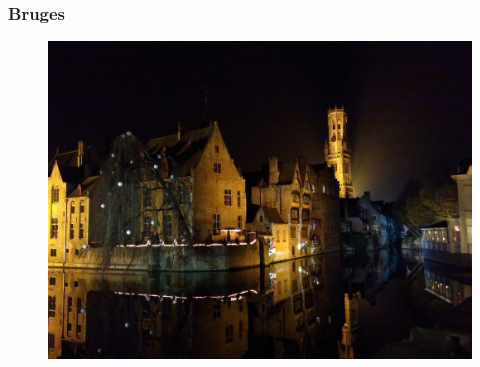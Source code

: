 \documentclass{beamer}
\begin{document}
\begin{frame}
  \frametitle{Bruges}
  \begin{figure}
    \centering
    \includegraphics[scale=0.2]{bruges}
\end{figure}
\end{frame}
\end{document}
